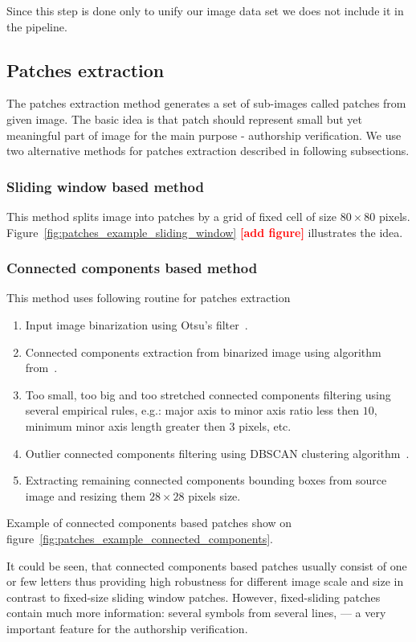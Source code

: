 \documentclass[conference,a4paper,twocolumn]{IEEEtran}
\newcommand{\todo}[1]{\textcolor{red}{\textbf{[#1]}}} %
\begin{document}
Since this step is done only to unify our image data set we does not include it in the pipeline.

\subsection{Patches extraction}
The patches extraction method generates a set of sub-images called patches from given image. The basic idea is that patch should represent small but yet meaningful part of image for the main purpose - authorship verification. We use two alternative methods for patches extraction described in following subsections.

\subsubsection{Sliding window based method}
This method splits image into patches by a grid of fixed cell of size $80\times 80$ pixels. Figure~\ref{fig:patches_example_sliding_window} \todo{add figure} illustrates the idea. 

\subsubsection{Connected components based method}
This method uses following routine for patches extraction

\begin{enumerate}
	\item Input image binarization using Otsu's filter~\cite{otsu1975threshold}.
	\item Connected components extraction from binarized image using algorithm from~\cite{fiorio1996connected_components}.
	\item Too small, too big and too stretched connected components filtering using several empirical rules, e.g.: major axis to minor axis ratio less then $10$, minimum minor axis length greater then $3$ pixels, etc.
	\item Outlier connected components filtering using DBSCAN clustering algorithm~\cite{ester1996dbscan}.
	\item Extracting remaining connected components bounding boxes from source image and resizing them $28\times 28$ pixels size.
\end{enumerate}

Example of connected components based patches show on figure~\ref{fig:patches_example_connected_components}. 

It could be seen, that connected components based patches usually consist of one or few letters thus providing high robustness for different image scale and size in contrast to fixed-size sliding window patches. However, fixed-sliding patches contain much more information: several symbols from several lines, --- a very important feature for the authorship verification.
%
\end{document}
